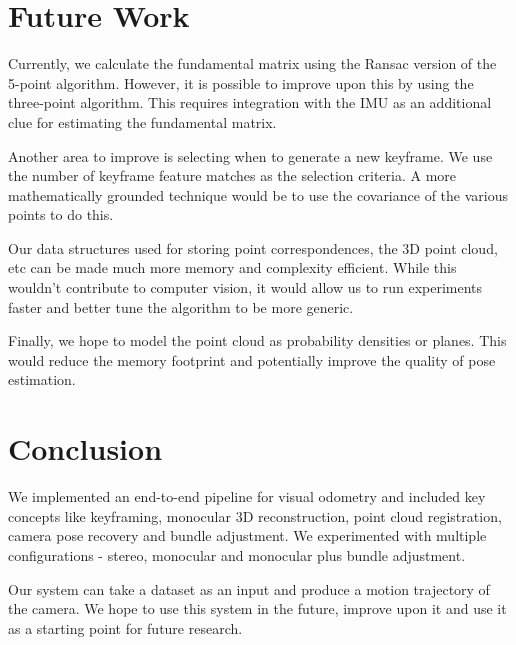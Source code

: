 \documentclass{article}
\begin{document}
\section{Future Work}

Currently, we calculate the fundamental matrix using the Ransac version of the 5-point algorithm. However, it is possible to improve upon this by using the three-point algorithm\cite{threepoint}. This requires integration with the IMU as an additional clue for estimating the fundamental matrix.

Another area to improve is selecting when to generate a new keyframe. We use the number of keyframe feature matches as the selection criteria. A more mathematically grounded technique would be to use the covariance of the various points to do this.

Our data structures used for storing point correspondences, the 3D point cloud, etc can be made much more memory and complexity efficient. While this wouldn't contribute to computer vision, it would allow us to run experiments faster and better tune the algorithm to be more generic.

Finally, we hope to model the point cloud as probability densities or planes. This would reduce the memory footprint and potentially improve the quality of pose estimation.

\section{Conclusion}
We implemented an end-to-end pipeline for visual odometry and included key concepts like keyframing, monocular 3D reconstruction, point cloud registration, camera pose recovery and bundle adjustment. We experimented with multiple configurations - stereo, monocular and monocular plus bundle adjustment.

Our system can take a dataset as an input and produce a motion trajectory of the camera. We hope to use this system in the future, improve upon it and use it as a starting point for future research.



\end{document}
